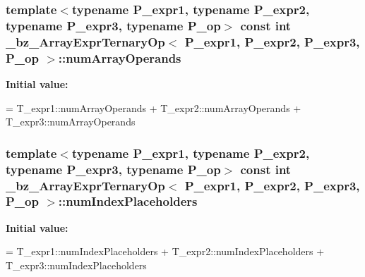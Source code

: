 \subsubsection[{num\+Array\+Operands}]{\setlength{\rightskip}{0pt plus 5cm}template$<$typename P\+\_\+expr1, typename P\+\_\+expr2, typename P\+\_\+expr3, typename P\+\_\+op$>$ const int {\bf \+\_\+bz\+\_\+\+Array\+Expr\+Ternary\+Op}$<$ P\+\_\+expr1, P\+\_\+expr2, P\+\_\+expr3, P\+\_\+op $>$\+::num\+Array\+Operands\hspace{0.3cm}{\ttfamily [static]}}\label{class__bz__ArrayExprTernaryOp_ab0747b722ffa00c636081d47f5f864c0}
{\bfseries Initial value\+:}
\begin{DoxyCode}
= T\_expr1::numArrayOperands
                         + T\_expr2::numArrayOperands
                         + T\_expr3::numArrayOperands
\end{DoxyCode}
\hypertarget{class__bz__ArrayExprTernaryOp_ae5cd34fbff7229b400350e5f4db0e81b}{}
\subsubsection[{num\+Index\+Placeholders}]{\setlength{\rightskip}{0pt plus 5cm}template$<$typename P\+\_\+expr1, typename P\+\_\+expr2, typename P\+\_\+expr3, typename P\+\_\+op$>$ const int {\bf \+\_\+bz\+\_\+\+Array\+Expr\+Ternary\+Op}$<$ P\+\_\+expr1, P\+\_\+expr2, P\+\_\+expr3, P\+\_\+op $>$\+::num\+Index\+Placeholders\hspace{0.3cm}{\ttfamily [static]}}\label{class__bz__ArrayExprTernaryOp_ae5cd34fbff7229b400350e5f4db0e81b}
{\bfseries Initial value\+:}
\begin{DoxyCode}
= T\_expr1::numIndexPlaceholders
                             + T\_expr2::numIndexPlaceholders
                             + T\_expr3::numIndexPlaceholders
\end{DoxyCode}
\hypertarget{class__bz__ArrayExprTernaryOp_afdb88cf98214c518580dcbc5ee7ad256}{}
